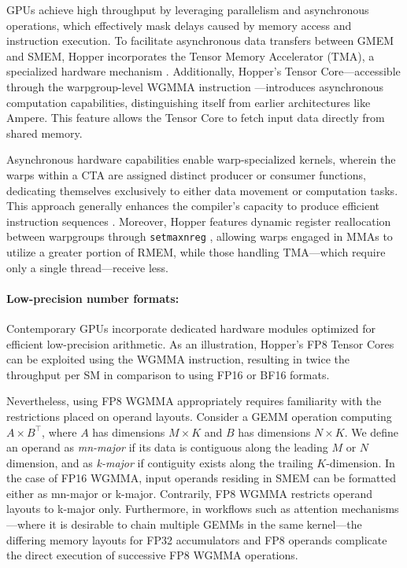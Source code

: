 GPUs achieve high throughput by leveraging parallelism and asynchronous operations, which effectively mask delays caused by memory access and instruction execution. To facilitate asynchronous data transfers between GMEM and SMEM, Hopper incorporates the Tensor Memory Accelerator (TMA), a specialized hardware mechanism \cite[\S7.29]{cuda}. Additionally, Hopper’s Tensor Core—accessible through the warpgroup-level WGMMA instruction \cite[\S9.7.14]{ptx}—introduces asynchronous computation capabilities, distinguishing itself from earlier architectures like Ampere. This feature allows the Tensor Core to fetch input data directly from shared memory.

Asynchronous hardware capabilities enable warp-specialized kernels, wherein the warps within a CTA are assigned distinct producer or consumer functions, dedicating themselves exclusively to either data movement or computation tasks. This approach generally enhances the compiler’s capacity to produce efficient instruction sequences \citep{warp-specialization-2011}. Moreover, Hopper features dynamic register reallocation between warpgroups through \verb|setmaxnreg| \cite[\S9.7.17.1]{ptx}, allowing warps engaged in MMAs to utilize a greater portion of RMEM, while those handling TMA—which require only a single thread—receive less.

\paragraph{Low-precision number formats:}
\label{sec:low-precision-gpu}
Contemporary GPUs incorporate dedicated hardware modules optimized for efficient low-precision arithmetic. As an illustration, Hopper’s FP8 Tensor Cores can be exploited using the WGMMA instruction, resulting in twice the throughput per SM in comparison to using FP16 or BF16 formats.

Nevertheless, using FP8 WGMMA appropriately requires familiarity with the restrictions placed on operand layouts. Consider a GEMM operation computing $A \times B^{\top}$, where $A$ has dimensions $M\times K$ and $B$ has dimensions $N\times K$. We define an operand as \emph{mn-major} if its data is contiguous along the leading $M$ or $N$ dimension, and as \emph{k-major} if contiguity exists along the trailing $K$-dimension. In the case of FP16 WGMMA, input operands residing in SMEM can be formatted either as mn-major or k-major. Contrarily, FP8 WGMMA restricts operand layouts to k-major only. Furthermore, in workflows such as attention mechanisms—where it is desirable to chain multiple GEMMs in the same kernel—the differing memory layouts for FP32 accumulators and FP8 operands complicate the direct execution of successive FP8 WGMMA operations.

